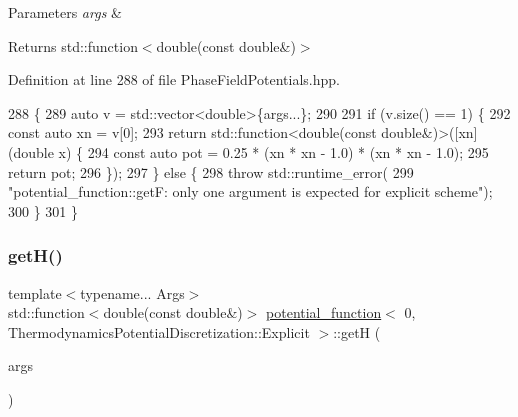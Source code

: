 \begin{DoxyParams}{Parameters}
{\em args} & \\
\hline
\end{DoxyParams}
\begin{DoxyReturn}{Returns}
std\+::function$<$double(const double\&)$>$ 
\end{DoxyReturn}


Definition at line 288 of file Phase\+Field\+Potentials.\+hpp.


\begin{DoxyCode}
288                                                         \{
289     \textcolor{keyword}{auto} v = std::vector<double>\{args...\};
290 
291     \textcolor{keywordflow}{if} (v.size() == 1) \{
292       \textcolor{keyword}{const} \textcolor{keyword}{auto} xn = v[0];
293       \textcolor{keywordflow}{return} std::function<double(const double&)>([xn](\textcolor{keywordtype}{double} x) \{
294         \textcolor{keyword}{const} \textcolor{keyword}{auto} pot = 0.25 * (xn * xn - 1.0) * (xn * xn - 1.0);
295         \textcolor{keywordflow}{return} pot;
296       \});
297     \} \textcolor{keywordflow}{else} \{
298       \textcolor{keywordflow}{throw} std::runtime\_error(
299           \textcolor{stringliteral}{"potential\_function::getF: only one argument is expected for explicit scheme"});
300     \}
301   \}
\end{DoxyCode}
\mbox{\label{structpotential__function_3_010_00_01ThermodynamicsPotentialDiscretization_1_1Explicit_01_4_a61efe16deb68d2a92e1e160fc71240b9}} 
\subsubsection{\texorpdfstring{get\+H()}{getH()}}
{\footnotesize\ttfamily template$<$typename... Args$>$ \\
std\+::function$<$double(const double\&)$>$ \hyperlink{structpotential__function}{potential\+\_\+function}$<$ 0, Thermodynamics\+Potential\+Discretization\+::\+Explicit $>$\+::getH (\begin{DoxyParamCaption}\item[{Args...}]{args }\end{DoxyParamCaption})\hspace{0.3cm}{\ttfamily [inline]}}



